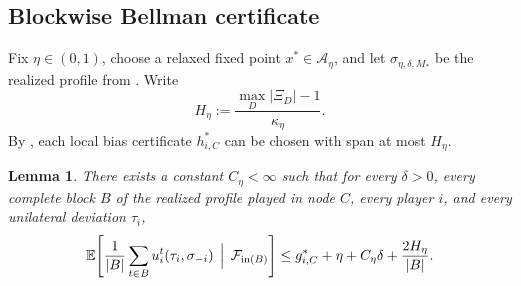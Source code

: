 \documentclass[12pt]{article}
\newtheorem{lemma}[theorem]{Lemma}
\theoremstyle{definition}
\newcommand{\E}{\mathbb{E}}
\newcommand{\1}{\mathbf{1}}
\newcommand{\cA}{\mathcal{A}}
\begin{document}
\subsection{Blockwise Bellman certificate}

Fix \(\eta\in(0,1)\), choose a relaxed fixed point \(x^*\in \cA_\eta\), and let
\(\sigma_{\eta,\delta,M_*}\) be the realized profile from .  Write
\[
H_\eta:=\frac{\max_D|\Xi_D|-1}{\kappa_\eta}.
\]
By , each local bias certificate \(h_{i,C}^*\) can be chosen with
span at most \(H_\eta\).

\begin{lemma}
\label{lem:block-bellman}
There exists a constant \(C_\eta<\infty\) such that for every \(\delta>0\), every complete
block \(B\) of the realized profile played in node \(C\), every player \(i\), and every
unilateral deviation \(\tau_i\),
\begin{equation}
\label{eq:block-bellman}
\E\!\left[
\frac1{|B|}\sum_{t\in B} u_i^t(\tau_i,\sigma_{-i})
\,\Bigm|\, \mathcal F_{\mathrm{in}(B)}
\right]
\le
g_{i,C}^*+\eta+C_\eta\delta+\frac{2H_\eta}{|B|}.
\end{equation}
\end{lemma}
\end{document}
